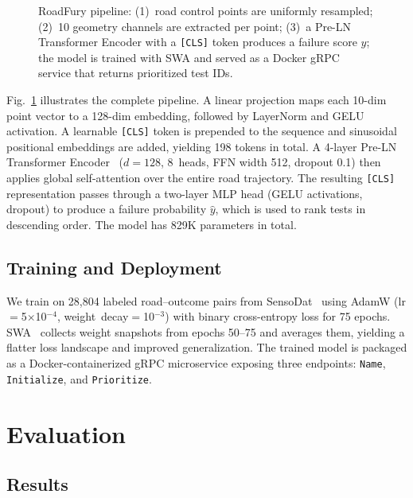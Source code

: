 \documentclass[conference]{IEEEtran}
\begin{document}
\begin{figure}[t]
\caption{RoadFury pipeline: (1)~road control points are uniformly resampled; (2)~10 geometry channels are extracted per point; (3)~a Pre-LN Transformer Encoder with a \texttt{[CLS]} token produces a failure score $\hat{y}$; the model is trained with SWA and served as a Docker gRPC service that returns prioritized test IDs.}
\label{fig:arch}
\end{figure}

Fig.~\ref{fig:arch} illustrates the complete pipeline.
A linear projection maps each 10-dim point vector to a 128-dim embedding, followed by LayerNorm and GELU activation.
A learnable \texttt{[CLS]} token is prepended to the sequence and sinusoidal positional embeddings are added, yielding 198 tokens in total.
A 4-layer Pre-LN Transformer Encoder~\cite{b11} ($d{=}128$, 8~heads, FFN width 512, dropout 0.1) then applies global self-attention over the entire road trajectory.
The resulting \texttt{[CLS]} representation passes through a two-layer MLP head (GELU activations, dropout) to produce a failure probability $\hat{y}$, which is used to rank tests in descending order.
The model has 829K parameters in total.

\subsection{Training and Deployment}

We train on 28,804 labeled road--outcome pairs from SensoDat~\cite{b7} using AdamW (lr$=$5$\times$10$^{-4}$, weight~decay$=$10$^{-3}$) with binary cross-entropy loss for 75 epochs.
SWA~\cite{b6} collects weight snapshots from epochs 50--75 and averages them, yielding a flatter loss landscape and improved generalization.
The trained model is packaged as a Docker-containerized gRPC microservice exposing three endpoints: \texttt{Name}, \texttt{Initialize}, and \texttt{Prioritize}.

\section{Evaluation}

\subsection{Results}
\end{document}

